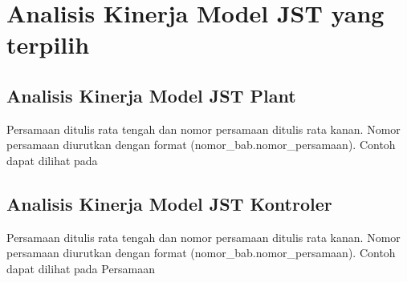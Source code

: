 \section{Analisis Kinerja Model JST yang terpilih}

\subsection{Analisis Kinerja Model JST Plant}
Persamaan ditulis rata tengah dan nomor persamaan ditulis rata kanan. Nomor persamaan
diurutkan dengan format (nomor\_bab.nomor\_persamaan). Contoh dapat dilihat pada

\subsection{Analisis Kinerja Model JST Kontroler}
Persamaan ditulis rata tengah dan nomor persamaan ditulis rata kanan. Nomor persamaan
diurutkan dengan format (nomor\_bab.nomor\_persamaan). Contoh dapat dilihat pada Persamaan